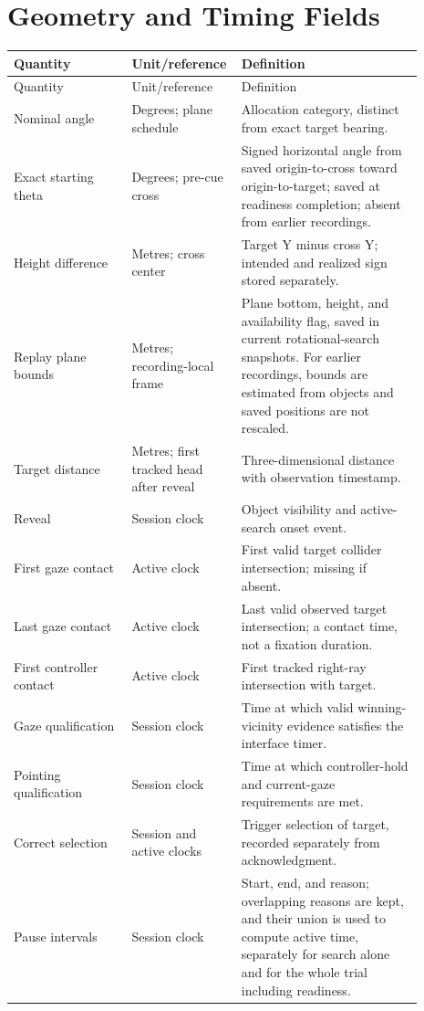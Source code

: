 \section{Geometry and Timing Fields}
\begingroup
{}
\begin{longtable}{@{}p{0.28\linewidth}p{0.18\linewidth}p{0.43\linewidth}@{}}
\toprule
Quantity & Unit/reference & Definition \\\midrule\endfirsthead
\toprule Quantity & Unit/reference & Definition \\\midrule\endhead
Nominal angle & Degrees; plane schedule & Allocation category, distinct from exact target bearing.\\
Exact starting theta & Degrees; pre-cue cross & Signed horizontal angle from saved origin-to-cross toward origin-to-target; saved at readiness completion; absent from earlier recordings.\\
Height difference & Metres; cross center & Target Y minus cross Y; intended and realized sign stored separately.\\
Replay plane bounds & Metres; recording-local frame & Plane bottom, height, and availability flag, saved in current rotational-search snapshots. For earlier recordings, bounds are estimated from objects and saved positions are not rescaled.\\
Target distance & Metres; first tracked head after reveal & Three-dimensional distance with observation timestamp.\\
Reveal & Session clock & Object visibility and active-search onset event.\\
First gaze contact & Active clock & First valid target collider intersection; missing if absent.\\
Last gaze contact & Active clock & Last valid observed target intersection; a contact time, not a fixation duration.\\
First controller contact & Active clock & First tracked right-ray intersection with target.\\
Gaze qualification & Session clock & Time at which valid winning-vicinity evidence satisfies the interface timer.\\
Pointing qualification & Session clock & Time at which controller-hold and current-gaze requirements are met.\\
Correct selection & Session and active clocks & Trigger selection of target, recorded separately from acknowledgment.\\
Pause intervals & Session clock & Start, end, and reason; overlapping reasons are kept, and their union is used to compute active time, separately for search alone and for the whole trial including readiness.\\

\end{longtable}
